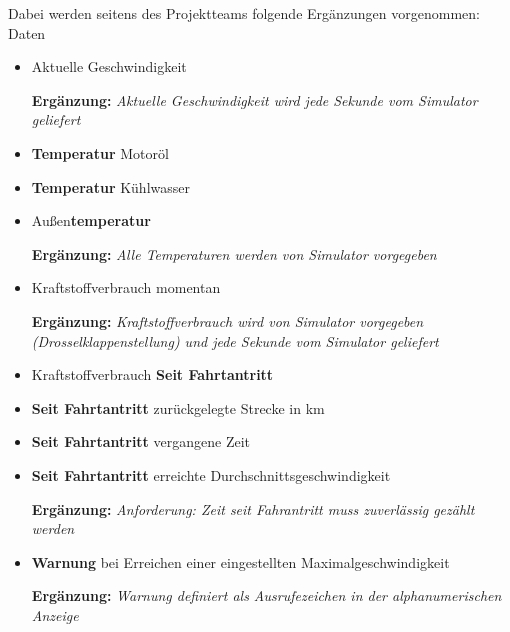 \documentclass[a4paper,12pt]{article}
\begin{document}
Dabei werden seitens des Projektteams folgende Ergänzungen vorgenommen:\\

Daten

\begin{itemize}

\item Aktuelle Geschwindigkeit

		\textbf{Ergänzung:} \emph{Aktuelle Geschwindigkeit wird jede Sekunde vom Simulator geliefert}

\item \textbf{Temperatur} Motoröl 
\item \textbf{Temperatur} Kühlwasser
\item Außen\textbf{temperatur}

		\textbf{Ergänzung:} \emph{Alle Temperaturen werden von Simulator vorgegeben}

\item Kraftstoffverbrauch momentan

		\textbf{Ergänzung:} \emph{Kraftstoffverbrauch wird von Simulator vorgegeben (Drosselklappenstellung) und jede Sekunde vom Simulator geliefert}

\item Kraftstoffverbrauch \textbf{Seit Fahrtantritt}
\item \textbf{Seit Fahrtantritt} zurückgelegte Strecke in km
\item \textbf{Seit Fahrtantritt} vergangene Zeit
\item \textbf{Seit Fahrtantritt} erreichte Durchschnittsgeschwindigkeit

		\textbf{Ergänzung:} \emph{Anforderung: Zeit seit Fahrantritt muss zuverlässig gezählt werden}

\item \textbf{Warnung} bei Erreichen einer eingestellten Maximalgeschwindigkeit

		\textbf{Ergänzung:} \emph{Warnung definiert als Ausrufezeichen in der alphanumerischen Anzeige}

\end{itemize}
\end{document}
